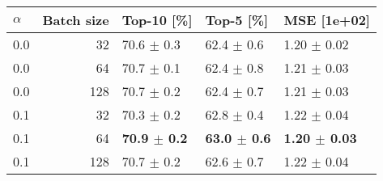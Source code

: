 \begin{table}[h]
\begin{tabular}{lrlll}
\toprule
$\alpha$ & Batch size & Top-10 [\%] & Top-5 [\%] & MSE [1e+02] \\
\midrule
0.0 & 32 & 70.6 $\pm$ 0.3 & 62.4 $\pm$ 0.6 & 1.20 $\pm$ 0.02 \\
0.0 & 64 & 70.7 $\pm$ 0.1 & 62.4 $\pm$ 0.8 & 1.21 $\pm$ 0.03 \\
0.0 & 128 & 70.7 $\pm$ 0.2 & 62.4 $\pm$ 0.7 & 1.21 $\pm$ 0.03 \\
0.1 & 32 & 70.3 $\pm$ 0.2 & 62.8 $\pm$ 0.4 & 1.22 $\pm$ 0.04 \\
0.1 & 64 & \textbf{70.9 $\pm$ 0.2} & \textbf{63.0 $\pm$ 0.6} & \textbf{1.20 $\pm$ 0.03} \\
0.1 & 128 & 70.7 $\pm$ 0.2 & 62.6 $\pm$ 0.7 & 1.22 $\pm$ 0.04 \\
\bottomrule
\end{tabular}
\end{table}
